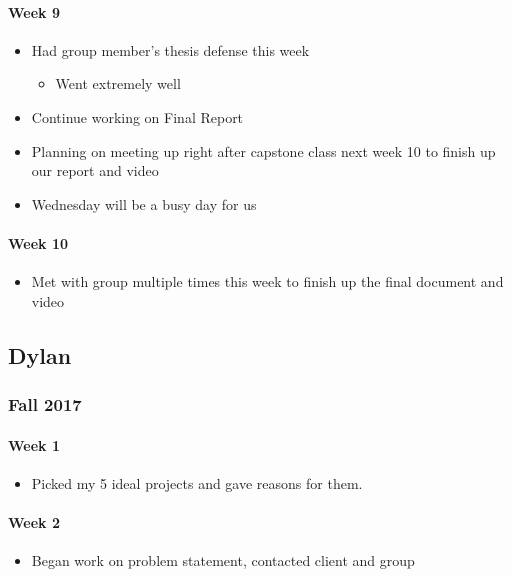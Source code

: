 \documentclass[onecolumn, draftclsnofoot,10pt, compsoc]{IEEEtran}
\begin{document}
      \paragraph{Week 9}
        \begin{itemize}
          \item Had group member's thesis defense this week
          \begin{itemize}
            \item Went extremely well
          \end{itemize}
          \item Continue working on Final Report
          \item Planning on meeting up right after capstone class next week 10 to finish up our report and video
          \item Wednesday will be a busy day for us
        \end{itemize}

      \paragraph{Week 10}
        \begin{itemize}
          \item Met with group multiple times this week to finish up the final document and video
        \end{itemize}

  \subsection{Dylan}
    \subsubsection{Fall 2017}
      \paragraph{Week 1}
        \begin{itemize}
          \item Picked my 5 ideal projects and gave reasons for them.
        \end{itemize}

      \paragraph{Week 2}
        \begin{itemize}
          \item Began work on problem statement, contacted client and group
        \end{itemize}
\end{document}
